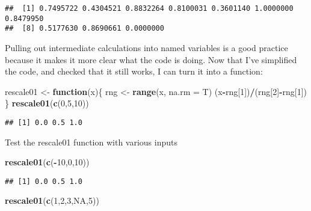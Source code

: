 \documentclass[
]{article}
\newenvironment{Shaded}{\begin{snugshade}}{\end{snugshade}}
\newcommand{\AttributeTok}[1]{\textcolor[rgb]{0.13,0.29,0.53}{#1}}
\newcommand{\ConstantTok}[1]{\textcolor[rgb]{0.56,0.35,0.01}{#1}}
\newcommand{\ControlFlowTok}[1]{\textcolor[rgb]{0.13,0.29,0.53}{\textbf{#1}}}
\newcommand{\DecValTok}[1]{\textcolor[rgb]{0.00,0.00,0.81}{#1}}
\newcommand{\FunctionTok}[1]{\textcolor[rgb]{0.13,0.29,0.53}{\textbf{#1}}}
\newcommand{\NormalTok}[1]{#1}
\newcommand{\OtherTok}[1]{\textcolor[rgb]{0.56,0.35,0.01}{#1}}
\newcommand{\SpecialCharTok}[1]{\textcolor[rgb]{0.81,0.36,0.00}{\textbf{#1}}}
\begin{document}
\begin{verbatim}
##  [1] 0.7495722 0.4304521 0.8832264 0.8100031 0.3601140 1.0000000 0.8479950
##  [8] 0.5177630 0.8690661 0.0000000
\end{verbatim}

Pulling out intermediate calculations into named variables is a good
practice because it makes it more clear what the code is doing. Now that
I've simplified the code, and checked that it still works, I can turn it
into a function:

\begin{Shaded}
\begin{Highlighting}[]
\NormalTok{rescale01 }\OtherTok{\textless{}{-}} \ControlFlowTok{function}\NormalTok{(x)\{}
\NormalTok{  rng }\OtherTok{\textless{}{-}} \FunctionTok{range}\NormalTok{(x, }\AttributeTok{na.rm =}\NormalTok{ T)}
\NormalTok{  (x}\SpecialCharTok{{-}}\NormalTok{rng[}\DecValTok{1}\NormalTok{])}\SpecialCharTok{/}\NormalTok{(rng[}\DecValTok{2}\NormalTok{]}\SpecialCharTok{{-}}\NormalTok{rng[}\DecValTok{1}\NormalTok{])}
\NormalTok{\}}
\FunctionTok{rescale01}\NormalTok{(}\FunctionTok{c}\NormalTok{(}\DecValTok{0}\NormalTok{,}\DecValTok{5}\NormalTok{,}\DecValTok{10}\NormalTok{))}
\end{Highlighting}
\end{Shaded}

\begin{verbatim}
## [1] 0.0 0.5 1.0
\end{verbatim}

Test the rescale01 function with various inputs

\begin{Shaded}
\begin{Highlighting}[]
\FunctionTok{rescale01}\NormalTok{(}\FunctionTok{c}\NormalTok{(}\SpecialCharTok{{-}}\DecValTok{10}\NormalTok{,}\DecValTok{0}\NormalTok{,}\DecValTok{10}\NormalTok{))}
\end{Highlighting}
\end{Shaded}

\begin{verbatim}
## [1] 0.0 0.5 1.0
\end{verbatim}

\begin{Shaded}
\begin{Highlighting}[]
\FunctionTok{rescale01}\NormalTok{(}\FunctionTok{c}\NormalTok{(}\DecValTok{1}\NormalTok{,}\DecValTok{2}\NormalTok{,}\DecValTok{3}\NormalTok{,}\ConstantTok{NA}\NormalTok{,}\DecValTok{5}\NormalTok{))}
\end{Highlighting}
\end{Shaded}
\end{document}
